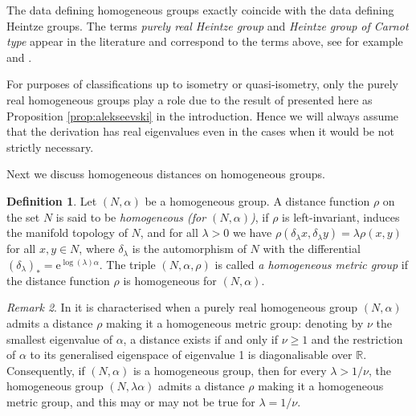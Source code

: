 \documentclass[a4paper,12pt]{amsart}
\newcommand{\e}{\mathrm{e}}
\theoremstyle{plain}
\theoremstyle{definition}
\newtheorem{maar}{Definition}[section]
\theoremstyle{plain}
\theoremstyle{remark}
\newtheorem{huom}[maar]{Remark}
\begin{document}
The data defining homogeneous groups exactly coincide with the data defining Heintze groups. The terms \emph{purely real Heintze group} and \emph{Heintze group of Carnot type} appear in the literature and correspond to the terms above, see for example \cite{avain:CPS} and \cite{Cornulier:qihlc}. 

For purposes of classifications up to isometry or quasi-isometry, only the purely real homogeneous groups play a role due to the result of \cite{alekseevski} presented here as Proposition \ref{prop:alekseevski} in the introduction. Hence we will always assume that the derivation has real eigenvalues even in the cases when it would be not strictly necessary.

Next we discuss homogeneous distances on homogeneous groups.

\begin{maar}
	Let \( (N,\alpha) \) be a homogeneous group.
	A distance function \( \rho \) on the set \(N\) is said to be \emph{homogeneous (for \( (N,\alpha) \))}, if \( \rho \) is left-invariant, induces the manifold topology of \( N \), and 
	for all \( \lambda > 0 \) we have
	\( \rho(\delta_\lambda x, \delta_\lambda y) = \lambda \rho(x,y) \) for all \( x,y \in N \), where \( \delta_\lambda \) is the automorphism of \( N \) with the differential \( (\delta_\lambda)_* = \e^{\log(\lambda) \alpha}  \). 
	The triple \( (N,\alpha,\rho) \) is called \emph{a homogeneous metric group} if the distance function \( \rho \) is homogeneous for \( (N,\alpha) \).
\end{maar}

\begin{huom} \label{huom:existence_of_distance}
	In \cite[Theorem B]{seba-enrico-dilations} it is characterised when a purely real homogeneous group \( (N,\alpha) \) admits a distance \( \rho \) making it a homogeneous metric group: denoting by \( \nu \) the smallest eigenvalue of $\alpha$, a distance exists if and only if \( \nu \ge 1 \) and the restriction of \( \alpha \) to its generalised eigenspace of eigenvalue 1 is diagonalisable over \( \mathbb{R} \). Consequently, if \( (N,\alpha) \) is a homogeneous group, then for every \( \lambda > 1/\nu \), the homogeneous group \( (N,\lambda \alpha) \) admits a distance \( \rho \) making it a homogeneous metric group, and this may or may not be true for \( \lambda =1/\nu \).
\end{huom}
\end{document}
